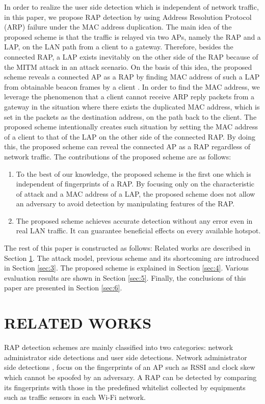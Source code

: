 \documentclass[conference]{IEEEtran}
\begin{document}
In order to realize the user side detection which is independent of network traffic, in this paper, we propose RAP detection by using Address Resolution Protocol (ARP) failure under the MAC address duplication.
The main idea of the proposed scheme is that the traffic is relayed via two APs, namely the RAP and a LAP, on the LAN path from a client to a gateway.
Therefore, besides the connected RAP, a LAP exists inevitably on the other side of the RAP because of the MITM attack in an attack scenario.
On the basis of this idea, the proposed scheme reveals a connected AP as a RAP by finding MAC address of such a LAP from obtainable beacon frames by a client \cite{beacon}.
In order to find the MAC address, we leverage the phenomenon that a client cannot receive ARP reply packets from a gateway in the situation where there exists the duplicated MAC address, which is set in the packets as the destination address, on the path back to the client.
The proposed scheme intentionally creates such situation by setting the MAC address of a client to that of the LAP on the other side of the connected RAP.
By doing this, the proposed scheme can reveal the connected AP as a RAP regardless of network traffic.
The contributions of the proposed scheme are as follows:
\begin{enumerate}
    \renewcommand{\labelenumi}{\arabic{enumi}).}
    \item To the best of our knowledge, the proposed scheme is the first one which is independent of fingerprints of a RAP. By focusing only on the characteristic of attack and a MAC address of a LAP, the proposed scheme does not allow an adversary to avoid detection by manipulating features of the RAP.
    \item The proposed scheme achieves accurate detection without any error even in real LAN traffic. It can guarantee beneficial effects on every available hotspot.
\end{enumerate}
The rest of this paper is constructed as follows: Related works are described in Section \ref{sec:2}.
The attack model, previous scheme and its shortcoming are introduced in Section \ref{sec:3}.
The proposed scheme is explained in Section \ref{sec:4}.
Various evaluation results are shown in Section \ref{sec:5}.
Finally, the conclusions of this paper are presented in Section \ref{sec:6}.

\section{RELATED WORKS}\label{sec:2}
RAP detection schemes are mainly classified into two categories: network administrator side detections and user side detections.
Network administrator side detections \cite{prapd}, \cite{clockskew} focus on the fingerprints of an AP such as RSSI and clock skew which cannot be spoofed by an adversary.
A RAP can be detected by comparing its fingerprints with those in the predefined whitelist collected by equipments such as traffic sensors in each Wi-Fi network.
\end{document}
